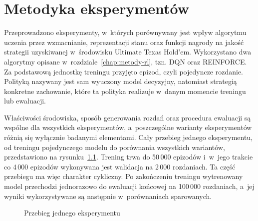 \chapter{Metodyka eksperymentów}
\label{chap:eksperymenty}

Przeprowadzono eksperymenty, w~których porównywany jest wpływ algorytmu
uczenia przez wzmacnianie, reprezentacji stanu oraz funkcji nagrody na
jakość strategii uzyskiwanej w~środowisku Ultimate Texas Hold'em.
Wykorzystano dwa algorytmy opisane w~rozdziale~\ref{chap:metody-rl},
tzn. DQN oraz REINFORCE. Za podstawową jednostkę treningu przyjęto
epizod, czyli pojedyncze rozdanie. Polityką nazywany jest sam wyuczony model
decyzyjny, natomiast strategią konkretne zachowanie, które ta polityka
realizuje w~danym momencie treningu lub ewaluacji.

Właściwości środowiska, sposób generowania rozdań oraz procedura
ewaluacji są wspólne dla wszystkich eksperymentów, a~poszczególne
warianty eksperymentów różnią się wyłącznie badanymi elementami.
Cały przebieg jednego eksperymentu, od treningu pojedynczego modelu do
porównania wszystkich wariantów, przedstawiono na
rysunku~\ref{fig:experiment-pipeline}. Trening trwa do 50\,000 epizodów
i~w~jego trakcie co 4\,000 epizodów wykonywana jest walidacja na
2\,000 rozdaniach. Ta część przebiegu ma więc charakter cykliczny.
Po zakończeniu treningu wytrenowany model przechodzi jednorazowo do
ewaluacji końcowej na 100\,000 rozdaniach, a~jej wyniki wykorzystywane są
następnie w~porównaniach sparowanych.

\begin{figure}[htbp]
    \centering
    \caption{Przebieg jednego eksperymentu}
    \label{fig:experiment-pipeline}
\end{figure}

